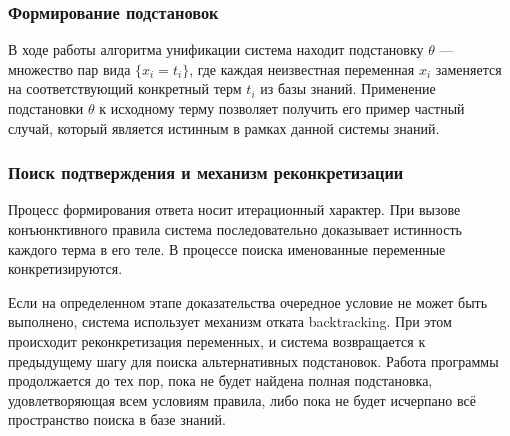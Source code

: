 \subsubsection{Формирование подстановок}
В ходе работы алгоритма унификации система находит подстановку 
$\theta$ --- множество пар вида $\{x_i = t_i\}$, где каждая неизвестная 
переменная $x_i$ заменяется на соответствующий конкретный терм $t_i$ из 
базы знаний. Применение подстановки $\theta$ к исходному терму позволяет 
получить его пример частный случай, который является истинным в рамках данной системы знаний.

\subsubsection{Поиск подтверждения и механизм реконкретизации}
Процесс формирования ответа носит итерационный характер. При вызове 
конъюнктивного правила система последовательно доказывает истинность 
каждого терма в его теле. В процессе поиска именованные переменные конкретизируются. 

Если на определенном этапе доказательства очередное условие не может быть 
выполнено, система использует механизм отката backtracking. При этом происходит 
реконкретизация переменных, и система возвращается к предыдущему шагу для поиска 
альтернативных подстановок. Работа программы продолжается до тех пор, пока не 
будет найдена полная подстановка, удовлетворяющая всем условиям правила, либо 
пока не будет исчерпано всё пространство поиска в базе знаний.
